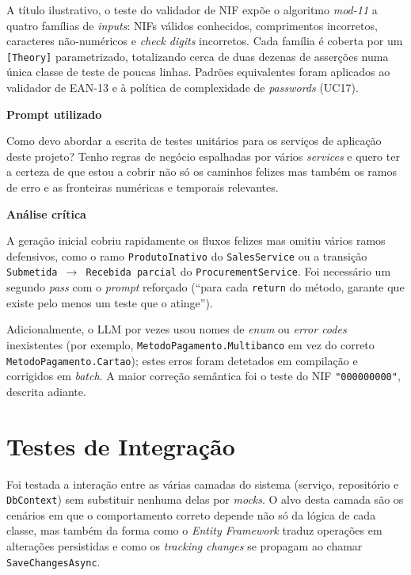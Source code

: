     A título ilustrativo, o teste do validador de NIF expõe o algoritmo \textit{mod-11} a quatro famílias de \textit{inputs}: NIFs válidos conhecidos, comprimentos incorretos, caracteres não-numéricos e \textit{check digits} incorretos. Cada família é coberta por um \texttt{[Theory]} parametrizado, totalizando cerca de duas dezenas de asserções numa única classe de teste de poucas linhas. Padrões equivalentes foram aplicados ao validador de EAN-13 e à política de complexidade de \textit{passwords} (UC17).

    \begin{tcolorbox}[title=Interação com o LLM]
    \textbf{Prompt utilizado}

    Como devo abordar a escrita de testes unitários para os serviços de aplicação deste projeto? Tenho regras de negócio espalhadas por vários \textit{services} e quero ter a certeza de que estou a cobrir não só os caminhos felizes mas também os ramos de erro e as fronteiras numéricas e temporais relevantes.

    \tcblower

    \textbf{Análise crítica}

    A geração inicial cobriu rapidamente os fluxos felizes mas omitiu vários ramos defensivos, como o ramo \texttt{ProdutoInativo} do \texttt{SalesService} ou a transição \texttt{Submetida~$\to$~Recebida~parcial} do \texttt{ProcurementService}. Foi necessário um segundo \textit{pass} com o \textit{prompt} reforçado (``para cada \texttt{return} do método, garante que existe pelo menos um teste que o atinge'').

    Adicionalmente, o LLM por vezes usou nomes de \textit{enum} ou \textit{error codes} inexistentes (por exemplo, \texttt{MetodoPagamento.Multibanco} em vez do correto \texttt{MetodoPagamento.Cartao}); estes erros foram detetados em compilação e corrigidos em \textit{batch}. A maior correção semântica foi o teste do NIF \texttt{"000000000"}, descrita adiante.
    \end{tcolorbox}

\section{Testes de Integração}

    Foi testada a interação entre as várias camadas do sistema (serviço, repositório e \texttt{DbContext}) sem substituir nenhuma delas por \textit{mocks}. O alvo desta camada são os cenários em que o comportamento correto depende não só da lógica de cada classe, mas também da forma como o \textit{Entity Framework} traduz operações em alterações persistidas e como os \textit{tracking changes} se propagam ao chamar \texttt{SaveChangesAsync}.

